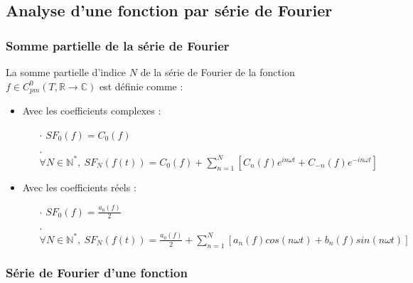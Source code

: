 \documentclass[12pt, a4paper]{article}
\begin{document}
\subsection{Analyse d'une fonction par série de Fourier}

\subsubsection{Somme partielle de la série de Fourier}

La somme partielle d'indice $N$ de la série de Fourier de la fonction $f \in C_{pm}^0(T, \mathbb{R} \to \mathbb{C})$ est définie comme :

\begin{itemize}
	\item Avec les coefficients complexes :
		\begin{itemize}
			\item[$\cdot$]
				$\displaystyle SF_0(f) = C_0(f)$
			\item[$\cdot$]
				$\displaystyle \forall N \in \mathbb{N}^{*}, ~ SF_N(f(t)) = C_0(f) + \sum_{n = 1}^{N}[C_n(f)e^{in\omega t} + C_{-n}(f)e^{-in\omega t}]$
		\end{itemize}

	\item Avec les coefficients réels :
		\begin{itemize}
			\item[$\cdot$]
				$\displaystyle SF_0(f) = \frac{a_0(f)}{2}$
			\item[$\cdot$]
				$\displaystyle \forall N \in \mathbb{N}^{*}, ~ SF_N(f(t)) = \frac{a_0(f)}{2} + \sum_{n = 1}^{N}[a_n(f)cos(n\omega t) + b_n(f)sin(n\omega t)]$
		\end{itemize}
\end{itemize}

\subsubsection{Série de Fourier d'une fonction}
\end{document}
